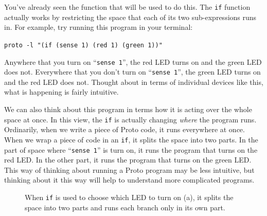 \documentclass{article}
\newcommand\code[1]{\begin{center}\var{#1}\end{center}}
\newcommand\var[1]{{\tt #1}}
\newcommand\qvar[1]{``{\tt #1}''}
\begin{document}
You've already seen the function that will be used to do this.  The
\var{if} function actually works by restricting the space that each of
its two sub-expressions runs in.  For example, try running this
program in your terminal:

\code{proto -l "(if (sense 1) (red 1) (green 1))"}

Anywhere that you turn on \qvar{sense 1}, the red LED turns on and the
green LED does not.  Everywhere that you don't turn on \qvar{sense 1},
the green LED turns on and the red LED does not.  Thought about in
terms of individual devices like this, what is happening is fairly
intuitive.

We can also think about this program in terms how it is acting over
the whole space at once.  In this view, the \var{if} is actually
changing {\em where} the program runs.  Ordinarily, when we write a
piece of Proto code, it runs everywhere at once.  When we wrap a piece
of code in an \var{if}, it splits the space into two parts.  In the
part of space where \qvar{sense 1} is turn on, it runs the program
that turns on the red LED.  In the other part, it runs the program
that turns on the green LED.  This way of thinking about running a
Proto program may be less intuitive, but thinking about it this way
will help to understand more complicated programs.

\begin{figure}[ht]
\centering
{}
\caption{When \var{if} is used to choose which LED to turn on (a), it
  splits the space into two parts and runs each branch only in its own
  part.}
\label{f:restriction}
\end{figure}
\end{document}
